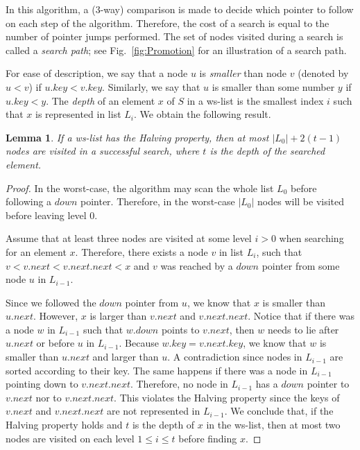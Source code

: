 \documentclass[11pt]{article}       %
\newtheorem{lemma}{Lemma}
\newcommand{\wlist}{ws-list\xspace}
\newcommand{\halving}{Halving property\xspace}
\begin{document}
In this algorithm, a (3-way) comparison is made to decide which pointer to follow on each step of the algorithm.
Therefore, the cost of a search is equal to the number of pointer jumps performed. The set of nodes visited during  a search is called a \emph{search path}; see Fig.~\ref{fig:Promotion} for an illustration of a search path.

For ease of description, we say that a node $u$ is \emph{smaller} than node $v$ (denoted by $u<v$) if $u.key < v.key$. Similarly, we say that $u$ is smaller than some number $y$ if $u.key < y$.
The \emph{depth} of an element $x$ of $S$ in a \wlist is the smallest index $i$ such that $x$ is represented in list $L_i$.
We obtain the following result.


\begin{lemma}\label{lemma:Visited Nodes}
If a \wlist has the \halving, then at most $|L_0| + 2(t-1)$ nodes are visited in a successful search, where $t$ is the depth of the searched element.
\end{lemma}
\begin{proof}
In the worst-case, the algorithm may scan the whole list $L_0$ before following a $down$ pointer. Therefore, in the worst-case $|L_0|$ nodes will be visited before leaving level 0.

Assume that at least three nodes are visited at some level $i>0$ when searching for an element $x$. 
Therefore, there exists a node $v$ in list $L_i$, such that $v<v.next < v.next.next < x$ and $v$ was reached by a $down$ pointer from some node $u$ in $L_{i-1}$. 

Since we followed the $down$ pointer from $u$, we know that $x$ is smaller than $u.next$. 
However, $x$ is larger than $v.next$ and $v.next.next$. Notice that if there was a node $w$ in $L_{i-1}$ such that $w.down$ points to $v.next$, then $w$ needs to lie after $u.next$ or before $u$ in $L_{i-1}$. 
Because $w.key = v.next.key$, we know that $w$ is smaller than $u.next$ and larger than $u$. A contradiction since nodes in $L_{i-1}$ are sorted according to their key. The same happens if there was a node in $L_{i-1}$ pointing down to $v.next.next$. 
Therefore, no node in $L_{i-1}$ has a $down$ pointer to $v.next$ nor to $v.next.next$. This violates the \halving since the keys of $v.next$ and $v.next.next$ are not represented in $L_{i-1}$. 
We conclude that, if the \halving holds and $t$ is the depth of $x$ in the \wlist, then at most two nodes are visited on each level $1\leq i\leq t$ before finding $x$.
\end{proof}
\end{document}
